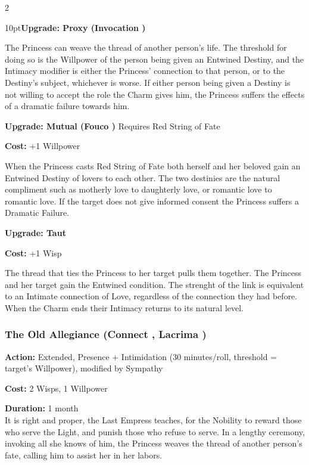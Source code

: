 \begin{multicols}{2}
\begin{myindentpar}{10pt}\textbf{Upgrade: Proxy (Invocation \textbullet\textbullet\textbullet\textbullet)}

The Princess can weave the thread of another person's life. The threshold for doing so is the Willpower of the person being given an Entwined Destiny, and the Intimacy modifier is either the Princess' connection to that person, or to the Destiny's subject, whichever is worse. If either person being given a Destiny is not willing to accept the role the Charm gives him, the Princess suffers the effects of a dramatic failure towards him.

\textbf{Upgrade: Mutual (Fouco \textbullet\textbullet\textbullet\textbullet)}
\noindent Requires Red String of Fate

\noindent \textbf{Cost:} +1 Willpower

When the Princess casts Red String of Fate both herself and her beloved gain an Entwined Destiny of lovers to each other. The two destinies are the natural compliment such as motherly love to daughterly love, or romantic love to romantic love. If the target does not give informed consent the Princess suffers a Dramatic Failure.

\textbf{Upgrade: Taut}

\noindent \textbf{Cost:} +1 Wisp

The thread that ties the Princess to her target pulls them together. The Princess and her target gain the Entwined condition. The strenght of the link is equivalent to an Intimate connection of Love, regardless of the connection they had before. When the Charm ends their Intimacy returns to its natural level.
\end{myindentpar}


\subsubsection*{The Old Allegiance (Connect \textbullet\textbullet\textbullet\textbullet, Lacrima \textbullet\textbullet\textbullet)}

\noindent \textbf{Action:} Extended, Presence + Intimidation (30 minutes/roll, threshold = target's Willpower), modified by Sympathy

\noindent \textbf{Cost:} 2 Wisps, 1 Willpower

\noindent \textbf{Duration:} 1 month\\

\noindent It is right and proper, the Last Empress teaches, for the Nobility to reward those who serve the Light, and punish those who refuse to serve. In a lengthy ceremony, invoking all she knows of him, the Princess weaves the thread of another person's fate, calling him to assist her in her labors.


\end{multicols}
